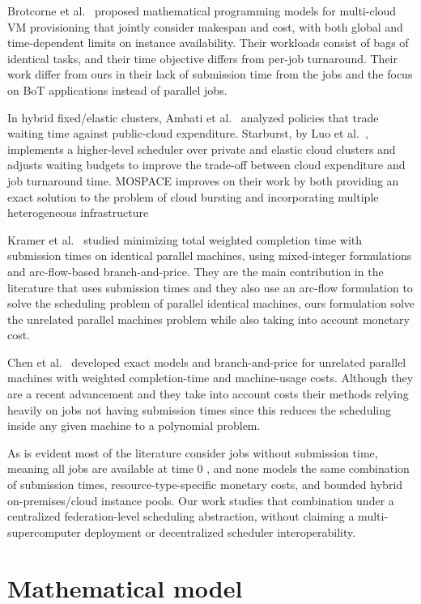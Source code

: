 \documentclass[conference]{IEEEtran}
\begin{document}
Brotcorne et al.~\cite{Brotcorne2023} proposed mathematical programming models for multi-cloud VM provisioning that jointly consider makespan and cost, with both global and time-dependent limits on instance availability. Their workloads consist of bags of identical tasks, and their time objective differs from per-job turnaround. Their work differ from ours in their lack of submission time from the jobs and the focus on BoT applications instead of parallel jobs.

In hybrid fixed/elastic clusters, Ambati et al.~\cite{ambati2021good} analyzed policies that trade waiting time against public-cloud expenditure. Starburst, by Luo et al.~\cite{Luo24}, implements a higher-level scheduler over private and elastic cloud clusters and adjusts waiting budgets to improve the trade-off between cloud expenditure and job turnaround time.  MOSPACE improves on their work by both providing an exact solution to the problem of cloud bursting and incorporating multiple heterogeneous infrastructure  

Kramer et al.~\cite{Kramer2020} studied minimizing total weighted completion time with submission times on identical parallel machines, using mixed-integer formulations and arc-flow-based branch-and-price. They are the main contribution in the literature that uses submission times and they also use an arc-flow formulation to solve the scheduling problem of parallel identical machines, ours formulation solve the unrelated parallel machines problem while also taking into account monetary cost.

Chen et al.~\cite{Chen2024} developed exact models and branch-and-price
for unrelated parallel machines with weighted completion-time and
machine-usage costs. Although they are a recent advancement and they take into account costs their methods relying heavily on jobs not having submission times since this reduces the scheduling inside any given machine to a polynomial problem.

As is evident most of the literature consider jobs without submission time, meaning all jobs are available at time 0 , and none models the same combination of submission times, resource-type-specific monetary costs, and bounded hybrid on-premises/cloud instance pools. Our work studies that combination under a centralized federation-level scheduling abstraction, without claiming a multi-supercomputer deployment or decentralized scheduler interoperability.
       

\section{Mathematical model}
\label{sec:model}
\end{document}

